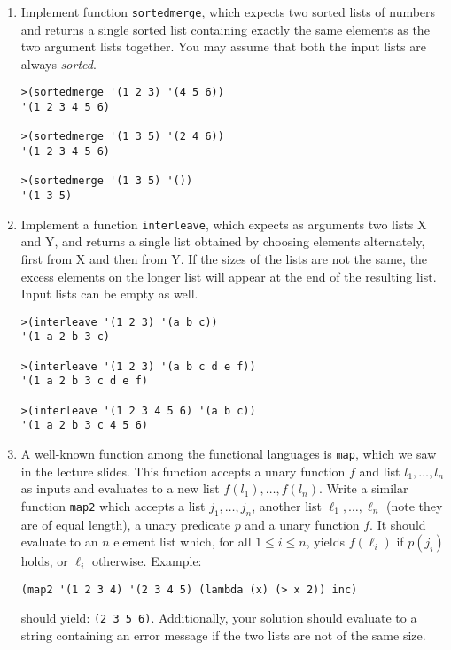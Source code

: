 \documentclass{exam}
\begin{document}
\begin{questions}
\begin{enumerate}
\begin{verbatim}
>(cancellist '(1 2 3) '(1 2 2 3 4)) 
'(() (4))
\end{verbatim}

\item Implement function \verb|sortedmerge|, which expects two sorted lists of numbers and returns a single sorted list containing exactly the same elements as the two argument lists together. You may assume that both the input lists are always \emph{sorted}.

\begin{verbatim}
>(sortedmerge '(1 2 3) '(4 5 6))
'(1 2 3 4 5 6)

>(sortedmerge '(1 3 5) '(2 4 6))
'(1 2 3 4 5 6)

>(sortedmerge '(1 3 5) '())
'(1 3 5)
\end{verbatim}

\item Implement a function \verb|interleave|, which expects as arguments two lists X and Y, and returns a single list obtained by choosing elements alternately, first from X and then from Y.  If the sizes of the lists are not the same, the excess elements on the longer list will appear at the end of the resulting list. Input lists can be empty as well.

\begin{verbatim}
>(interleave '(1 2 3) '(a b c))
'(1 a 2 b 3 c)

>(interleave '(1 2 3) '(a b c d e f))
'(1 a 2 b 3 c d e f)

>(interleave '(1 2 3 4 5 6) '(a b c))
'(1 a 2 b 3 c 4 5 6)
\end{verbatim}

\item A well-known function among the functional languages is \verb|map|, which we saw in the lecture slides.  This function 
accepts a unary function $f$ and list $l_1,\ldots,l_n$ as inputs and evaluates to a new list $f(l_1),\ldots,f(l_n)$.
Write a similar function \verb|map2|
which accepts a list $j_1,\ldots,j_n$, another list $\ell_1,\ldots,\ell_n$ (note they are of equal length), a unary predicate 
$p$ and a unary function $f$.  It should evaluate to an $n$ element list which, for 
all $1 \leq i \leq n$, yields $f(\ell_i)$ if $p(j_i)$ holds, or $\ell_i$ otherwise.
Example:

\begin{verbatim}
(map2 '(1 2 3 4) '(2 3 4 5) (lambda (x) (> x 2)) inc)
\end{verbatim}

should yield: \verb|(2 3 5 6)|.  Additionally, your solution should evaluate to a string containing an error message if the
two lists are not of the same size.


\end{enumerate}
\end{questions}
\end{document}
